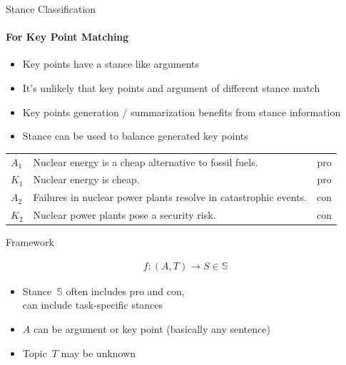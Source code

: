 \documentclass[english,handout]{mlutalk}
\begin{document}
\begin{frame}{Stance Classification} %
  \framesubtitle{For Key Point Matching}
  
  \begin{itemize}
    \item Key points have a stance like arguments
    \item It's unlikely that key points and argument of different stance match
    \item Key points generation / summarization benefits from stance information~\cite{SanchanAB2017}
    \item Stance can be used to balance generated key points~\cite{ChowandaSSS2017}
  \end{itemize}

  \begin{example}
    \footnotesize\centering\vspace*{1ex}
    \begin{tabular}{llc}
      \toprule
      \(A_1\) & Nuclear energy is a cheap alternative to fossil fuels. & pro \\
      \(K_1\) & Nuclear energy is cheap. & pro \\
      \midrule
      \(A_2\) & Failures in nuclear power plants resolve in catastrophic events. & con \\
      \(K_2\) & Nuclear power plants pose a security risk. & con \\
      \bottomrule
    \end{tabular}
  \end{example}

\end{frame}

\begin{frame}{Framework} %
  
  \begin{align*}
    f: (A,T) \rightarrow S \in \mathbb{S}
  \end{align*}
  
  \begin{itemize}
    \item Stance~\(\mathbb{S}\) often includes pro and con, \\ can include task-specific stances
    \item \(A\) can be argument or key point (basically any sentence)
    \item Topic~\(T\) may be unknown
  \end{itemize}

\end{frame}
\end{document}
